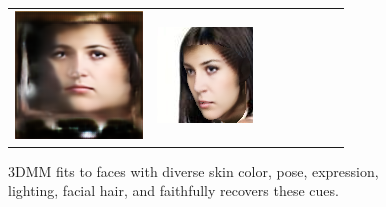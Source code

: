 \begin{figure}[t!]
\begin{center}
\begin{tabular}{ @{\hskip 1.5mm}c@{\hskip 1.5mm}c@{\hskip 1.5mm}c@{\hskip 1.5mm}c@{}c@{}c@{}c@{\hskip 1.5mm}c@{}}
\includegraphics[width=\FittingFigWid]{img/results/CelebA/pred_CelebA_tex_245.png} &
\includegraphics[width=\FittingFigWid]{img/results/CelebA/pred_CelebA_tex_245_img.png} &
\\
\end{tabular}
\vspace{-2mm}
\caption{\small 3DMM fits to faces with diverse skin color, pose, expression, lighting, facial hair, and faithfully recovers these cues.}
\label{fig:3dmm_fitting}\figvspace
\end{center}
\end{figure}



